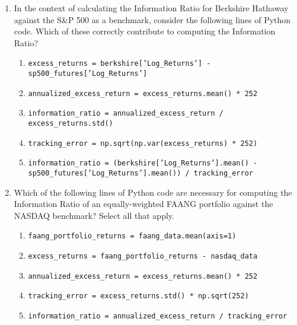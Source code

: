 \documentclass{article}
\begin{document}
\begin{enumerate}
    \item In the context of calculating the Information Ratio for Berkshire Hathaway against the S\&P 500 as a benchmark, consider the following lines of Python code. Which of these correctly contribute to computing the Information Ratio?
    \begin{enumerate}
        \item \texttt{excess\_returns = berkshire['Log\_Returns'] - sp500\_futures['Log\_Returns']}
        \item \texttt{annualized\_excess\_return = excess\_returns.mean() * 252}
        \item \texttt{information\_ratio = annualized\_excess\_return / excess\_returns.std()}
        \item \texttt{tracking\_error = np.sqrt(np.var(excess\_returns) * 252)}
        \item \texttt{information\_ratio = (berkshire['Log\_Returns'].mean() - \\ sp500\_futures['Log\_Returns'].mean()) / tracking\_error}
    \end{enumerate}

    \item Which of the following lines of Python code are necessary for computing the Information Ratio of an equally-weighted FAANG portfolio against the NASDAQ benchmark? Select all that apply.
    
    \begin{enumerate}
        \item \texttt{faang\_portfolio\_returns = faang\_data.mean(axis=1)}
        \item \texttt{excess\_returns = faang\_portfolio\_returns - nasdaq\_data}
        \item \texttt{annualized\_excess\_return = excess\_returns.mean() * 252}
        \item \texttt{tracking\_error = excess\_returns.std() * np.sqrt(252)}
        \item \texttt{information\_ratio = annualized\_excess\_return / tracking\_error}
    \end{enumerate}
    
\end{enumerate}

\clearpage



\end{document}
